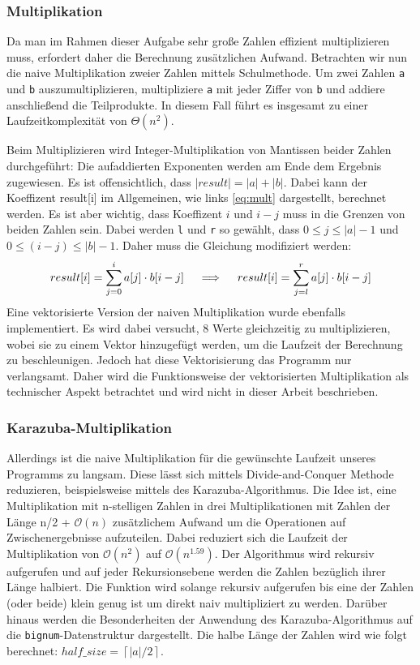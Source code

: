 \documentclass[course=erap]{aspdoc}
\begin{document}
\subsubsection{Multiplikation}
Da man im Rahmen dieser Aufgabe sehr große Zahlen effizient multiplizieren muss, erfordert daher die Berechnung zusätzlichen Aufwand. Betrachten wir nun die naive Multiplikation zweier Zahlen mittels Schulmethode. Um zwei Zahlen \texttt{a} und \texttt{b} auszumultiplizieren, multipliziere \texttt{a} mit jeder Ziffer von \texttt{b} und addiere anschließend die Teilprodukte. In diesem Fall führt es insgesamt zu einer Laufzeitkomplexität von $\Theta(n^2)$. 

Beim Multiplizieren wird Integer-Multiplikation von Mantissen beider Zahlen durchgeführt: Die aufaddierten Exponenten werden am Ende dem Ergebnis zugewiesen. Es ist offensichtlich, dass $|result| = |a| + |b|$. Dabei kann der Koeffizent result[i] im Allgemeinen, wie links \ref{eq:mult} dargestellt, berechnet werden. Es ist aber wichtig, dass Koeffizent $i$ und $i - j$ muss in die Grenzen von beiden Zahlen sein. Dabei werden \texttt{l} und \texttt{r}  so gewählt, dass $0 \leq j \leq |a| - 1$ und $0 \leq (i - j) \leq |b| - 1 $. Daher muss die Gleichung modifiziert werden:
\begin{equation}
result[i] = \sum_{j=0}^i {a[j] \cdot b[i - j]} \\ \quad \implies \quad
result[i] = \sum_{j=l}^r {a[j] \cdot b[i - j]}
\label{eq:mult}
\end{equation}
Eine vektorisierte Version der naiven Multiplikation wurde ebenfalls implementiert. Es wird dabei versucht, 8 Werte gleichzeitig zu multiplizieren, wobei sie zu einem Vektor hinzugefügt werden, um die Laufzeit der Berechnung zu beschleunigen. Jedoch hat diese Vektorisierung das Programm nur verlangsamt. Daher wird die Funktionsweise der vektorisierten Multiplikation als technischer Aspekt betrachtet und wird nicht in dieser Arbeit beschrieben.

\subsubsection{Karazuba-Multiplikation} 
Allerdings ist die naive Multiplikation für die gewünschte Laufzeit unseres Programms zu langsam. Diese lässt sich mittels Divide-and-Conquer Methode reduzieren, beispielsweise mittels des Karazuba-Algorithmus. Die Idee ist, eine Multiplikation mit n-stelligen Zahlen in drei Multiplikationen mit Zahlen der Länge n/2 + $\mathcal{O}(n)$ zusätzlichem Aufwand um die Operationen auf Zwischenergebnisse aufzuteilen. Dabei reduziert sich die Laufzeit der Multiplikation von $\mathcal{O}(n^{2})$ auf $\mathcal{O}(n^{1.59})$. Der Algorithmus wird rekursiv aufgerufen und auf jeder Rekursionsebene werden die Zahlen bezüglich ihrer Länge halbiert. Die Funktion wird solange rekursiv aufgerufen bis eine der Zahlen (oder beide) klein genug ist um direkt naiv multipliziert zu werden. Darüber hinaus werden die Besonderheiten der Anwendung des Karazuba-Algorithmus auf die \texttt{bignum}-Datenstruktur dargestellt. Die halbe Länge der Zahlen wird wie folgt berechnet: $half\_size = \left\lceil |a|/2 \right \rceil$.
\end{document}
